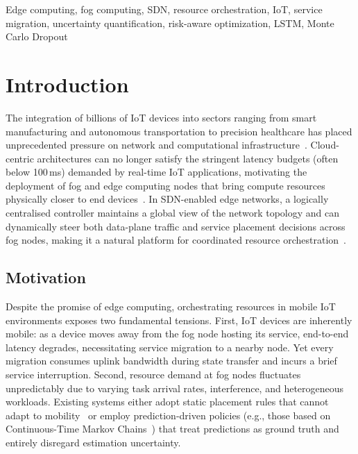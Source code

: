 \documentclass[conference]{IEEEtran}
\begin{document}
\begin{IEEEkeywords}
Edge computing, fog computing, SDN, resource orchestration, IoT, service
migration, uncertainty quantification, risk-aware optimization,
LSTM, Monte Carlo Dropout
\end{IEEEkeywords}

\section{Introduction}
\label{sec:intro}

The integration of billions of IoT devices into sectors ranging from
smart manufacturing and autonomous transportation to precision healthcare
has placed unprecedented pressure on network and computational
infrastructure~\cite{shi2016edge,mahmud2018fog}. Cloud-centric
architectures can no longer satisfy the stringent latency budgets (often
below 100\,ms) demanded by real-time IoT applications, motivating the
deployment of fog and edge computing nodes that bring compute resources
physically closer to end devices~\cite{mach2017mobile,hu2017survey}.
In SDN-enabled edge networks, a logically centralised controller
maintains a global view of the network topology and can dynamically
steer both data-plane traffic and service placement decisions across fog
nodes, making it a natural platform for coordinated resource
orchestration~\cite{bera2016mobility,misra2019detour}.

\subsection{Motivation}

Despite the promise of edge computing, orchestrating resources in mobile
IoT environments exposes two fundamental tensions. First, IoT devices
are inherently mobile: as a device moves away from the fog node hosting
its service, end-to-end latency degrades, necessitating service
migration to a nearby node. Yet every migration consumes uplink
bandwidth during state transfer and incurs a brief service interruption.
Second, resource demand at fog nodes fluctuates unpredictably due to
varying task arrival rates, interference, and heterogeneous workloads.
Existing systems either adopt static placement rules that cannot adapt
to mobility~\cite{fan2018towards,agarwal2016efficient} or employ
prediction-driven policies (e.g., those based on Continuous-Time Markov
Chains~\cite{wang2019mobility}) that treat predictions as ground truth
and entirely disregard estimation uncertainty.
\end{document}
